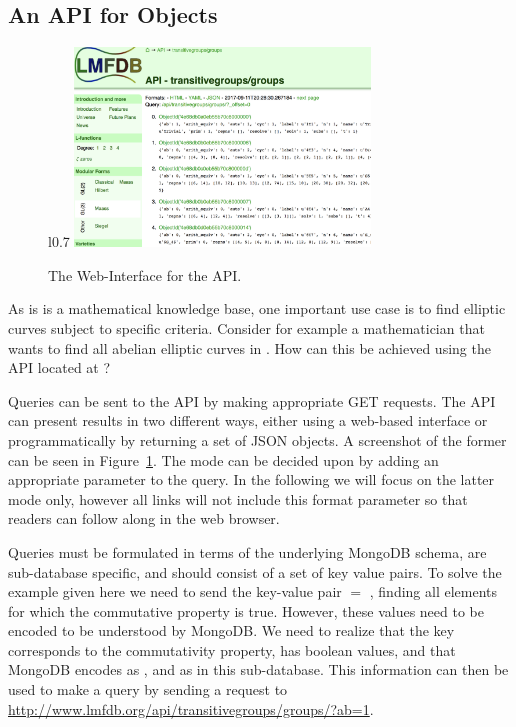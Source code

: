 \subsection{An API for \lmfdb Objects}\label{sec:sota:api}

\begin{figure}l{0.7\textwidth}\centering
  \includegraphics[width=0.7\textwidth]{APIScreenshot.png}
  \caption[The Web-Interface for the \lmfdb API. ]{
    The Web-Interface for the \lmfdb API. 
  }
  \label{fig:apiscreenshot}
\end{figure}
As \lmfdb is is a mathematical knowledge base, one important use case is to find elliptic curves subject to specific criteria. 
Consider for example a mathematician that wants to find all abelian elliptic curves in \lmfdb. 
How can this be achieved using the \lmfdb API located at \cite{lmfdbapi}? 

Queries can be sent to the API by making appropriate GET requests. 
The \lmfdb API can present results in two different ways, either using a web-based interface or programmatically by returning a set of JSON objects. 
A screenshot of the former can be seen in Figure~\ref{fig:apiscreenshot}. 
The mode can be decided upon by adding an appropriate parameter to the query. 
In the following we will focus on the latter mode only, however all links will not include this format parameter so that readers can follow along in the web browser. 

Queries must be formulated in terms of the underlying MongoDB schema, are sub-database specific, and should consist of a set of key value pairs. 
To solve the example given here we need to send the key-value pair $ = $ , finding all elements for which the commutative property is true. 
However, these values need to be encoded to be understood by MongoDB. 
We need to realize that the  key corresponds to the commutativity property, has boolean values, and that MongoDB encodes  as , and  as  in this \lmfdb sub-database. 
This information can then be used to make a query by sending a request to \url{http://www.lmfdb.org/api/transitivegroups/groups/?ab=1}. 

